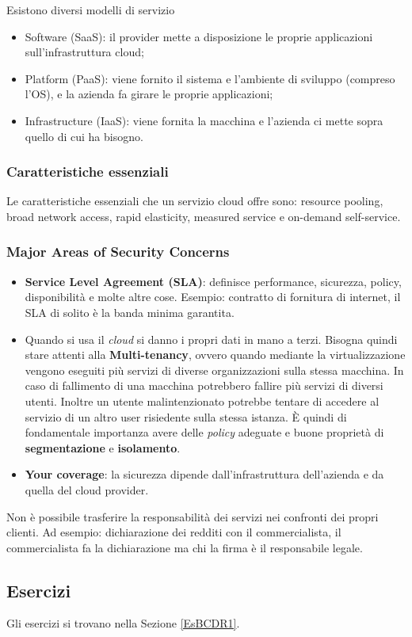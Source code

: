 Esistono diversi modelli di servizio
\begin{itemize}
  \item Software (SaaS): il provider mette a disposizione le proprie
  applicazioni sull'infrastruttura cloud;
  \item Platform (PaaS): viene fornito il sistema e l'ambiente di 
  sviluppo (compreso l'OS), e la azienda fa girare le proprie applicazioni;
  \item Infrastructure (IaaS): viene fornita la macchina e l'azienda ci mette
  sopra quello di cui ha bisogno.
\end{itemize}

\subsubsection{Caratteristiche essenziali}

Le caratteristiche essenziali che un servizio cloud offre sono: resource
pooling, broad network access, rapid elasticity, measured service e on-demand
self-service.

\subsubsection{Major Areas of Security Concerns}


\begin{itemize}
 \item \textbf{Service Level Agreement (SLA)}: definisce performance,
sicurezza, policy, disponibilità e molte altre cose. Esempio: contratto di
fornitura di internet, il SLA di solito è la banda minima garantita.
 \item Quando si usa il \textit{cloud} si danno i propri dati in mano a
terzi. Bisogna quindi stare attenti alla \textbf{Multi-tenancy}, ovvero
quando mediante la virtualizzazione vengono eseguiti più servizi
di diverse organizzazioni sulla stessa macchina.
In caso di fallimento di una macchina potrebbero fallire più servizi di
diversi utenti. Inoltre un utente malintenzionato
potrebbe tentare di accedere al servizio di un altro user risiedente
sulla stessa istanza.
È quindi di fondamentale importanza avere delle \textit{policy} adeguate
e buone proprietà di \textbf{segmentazione} e \textbf{isolamento}.
\item \textbf{Your coverage}: la sicurezza dipende dall'infrastruttura
dell'azienda e da quella del cloud provider.
\end{itemize}

Non è possibile trasferire la responsabilità dei servizi nei confronti dei
propri clienti. Ad esempio: dichiarazione dei redditi con il commercialista, il
commercialista fa la dichiarazione ma chi la firma è il responsabile legale.


\subsection{Esercizi}

Gli esercizi si trovano nella Sezione \ref{EsBCDR1}.
